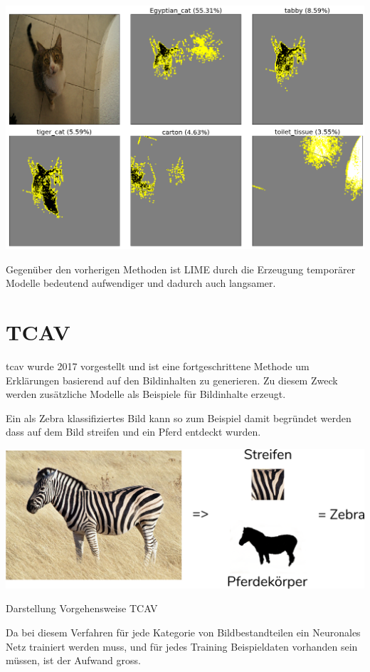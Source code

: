\documentclass[
  12pt, %
  a4paper, %
  oneside, %
  openany, 
  numbers=noenddot, %
  BCOR=5mm, %
  parskip=half*, %
  thesis, %
]{bfhbook}
\begin{document}
\includegraphics[width=\textwidth]{Bilder/Lime-Classes.png}

Gegenüber den vorherigen Methoden ist LIME durch die Erzeugung temporärer Modelle bedeutend aufwendiger und dadurch auch langsamer.
\clearpage
\section{TCAV}
 \acrfull{tcav} wurde 2017 vorgestellt \parencite{Kim2017} und ist eine fortgeschrittene Methode um Erklärungen basierend auf den Bildinhalten zu generieren. Zu diesem Zweck werden zusätzliche Modelle als Beispiele für Bildinhalte erzeugt.
 
\break
 Ein als Zebra klassifiziertes Bild kann so zum Beispiel damit begründet werden dass auf dem Bild streifen und ein Pferd entdeckt wurden.
\begin{center}
\begin{minipage}[t]{\linewidth}
\includegraphics[width=\textwidth]{Bilder/Zebra-Explanation.PNG}
\caption{Darstellung Vorgehensweise TCAV}
\end{minipage}
\end{center}
Da bei diesem Verfahren für jede Kategorie von Bildbestandteilen ein Neuronales Netz trainiert werden muss, und für jedes Training Beispieldaten vorhanden sein müssen, ist der Aufwand gross. 
\end{document}
